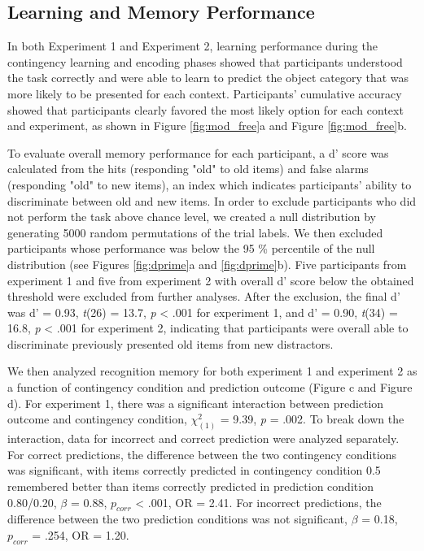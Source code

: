 \documentclass[a4paper,12pt]{article}
\begin{document}
\subsection{Learning and Memory Performance}
In both Experiment 1 and Experiment 2, learning performance during the contingency learning and encoding phases showed that participants understood the task correctly and were able to learn to predict the object category that was more likely to be presented for each context. Participants’ cumulative accuracy showed that participants clearly favored the most likely option for each context and experiment, as shown in Figure \ref{fig:mod_free}a and Figure \ref{fig:mod_free}b.
\par
To evaluate overall memory performance for each participant, a d' score was calculated from the hits (responding "old" to old items) and false alarms (responding "old" to new items), an index which indicates participants' ability to discriminate between old and new items. In order to exclude participants who did not perform the task above chance level, we created a null distribution by generating 5000 random permutations of the trial labels. We then excluded participants whose performance was below the 95 \% percentile of the null distribution (see Figures \ref{fig:dprime}a and \ref{fig:dprime}b). Five participants from experiment 1 and five from experiment 2 with overall d' score below the obtained threshold were excluded from further analyses. After the exclusion, the final d' was d' = 0.93,  \textit{t}(26) = 13.7, \textit{p} < .001 for experiment 1, and d’ = 0.90,  \textit{t}(34) = 16.8, \textit{p} < .001 for experiment 2, indicating that participants were overall able to discriminate previously presented old items from new distractors. \par
We then analyzed recognition memory for both experiment 1 and experiment 2 as a function of contingency condition and prediction outcome (Figure \label{fig:mod_free}c and Figure \label{fig:mod_free}d). 
For experiment 1, there was a significant interaction between prediction outcome and contingency condition, $\chi^2_{(1)}$ = 9.39, \textit{p} = .002. To break down the interaction, data for incorrect and correct prediction were analyzed separately. For correct predictions, the difference between the two contingency conditions was significant, with items correctly predicted in contingency condition 0.5 remembered better than items correctly predicted in prediction condition 0.80/0.20,  
$\beta$ = 0.88, $p_{corr}$ < .001, OR = 2.41. For incorrect predictions, the difference between the two prediction conditions was not significant, $\beta$ = 0.18, $p_{corr}$ = .254, OR = 1.20.
\end{document}
